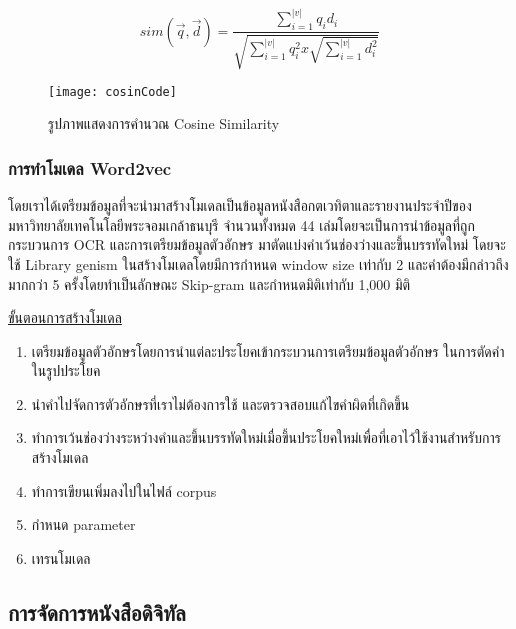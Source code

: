 \begin{equation}
    sim(\vec{q},\vec{d})=\frac{\sum_{i=1}^{|v|}q_{i}d_{i} }{\sqrt{\sum_{i=1}^{|v|}q^{2}_{i}x\sqrt{\sum_{i=1}^{|v|}d^{2}_{i}}}}
    \end{equation}    

\begin{figure}[H]
    \centering
    \texttt{[image: cosinCode]}
    \caption{รูปภาพแสดงการคำนวณ Cosine Similarity}\label{fig:cosinCode}
\end{figure}

\subsubsection{การทำโมเดล Word2vec}

โดยเราได้เตรียมข้อมูลที่จะนำมาสร้างโมเดลเป็นข้อมูลหนังสือกตเวทิตาและรายงานประจำปีของมหาวิทยาลัยเทคโนโลยีพระจอมเกล้าธนบุรี 
จำนวนทั้งหมด 44 เล่มโดยจะเป็นการนำข้อมูลที่ถูกกระบวนการ OCR และการเตรียมข้อมูลตัวอักษร มาตัดแบ่งคำเว้นช่องว่างและขึ้นบรรทัดใหม่ 
โดยจะใช้ Library genism ในสร้างโมเดลโดยมีการกำหนด window size เท่ากับ 2 และคำต้องมีกล่าวถึงมากกว่า 5 ครั้งโดยทำเป็นลักษณะ Skip-gram และกำหนดมิติเท่ากับ 1,000 มิติ

\underline{ขั้นตอนการสร้างโมเดล}

\begin{enumerate}
    \item เตรียมข้อมูลตัวอักษรโดยการนำแต่ละประโยคเข้ากระบวนการเตรียมข้อมูลตัวอักษร ในการตัดคำในรูปประโยค
    \item นำคำไปจัดการตัวอักษรที่เราไม่ต้องการใช้ และตรวจสอบแก้ไขคำผิดที่เกิดขึ้น
    \item ทำการเว้นช่องว่างระหว่างคำและขึ้นบรรทัดใหม่เมื่อขึ้นประโยคใหม่เพื่อที่เอาไว้ใช้งานสำหรับการสร้างโมเดล
    \item ทำการเขียนเพิ่มลงไปในไฟล์ corpus
    \item กำหนด parameter 
    \item เทรนโมเดล
\end{enumerate}

\subsection{การจัดการหนังสือดิจิทัล}

